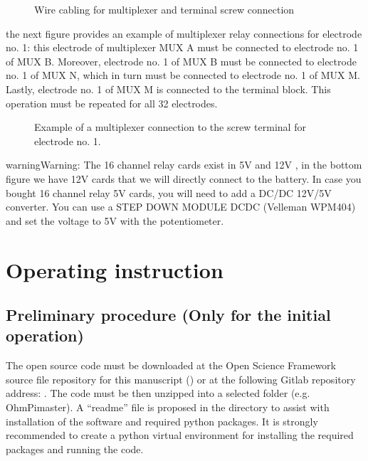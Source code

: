 \documentclass[letterpaper,10pt,english]{sphinxmanual}
\let\sphinxpxdimen\pdfpxdimen\else\newdimen\sphinxpxdimen
\begin{document}
\begin{figure}[htbp]
\centering
\capstart

\noindent\sphinxincludegraphics[width=800\sphinxpxdimen,height=300\sphinxpxdimen]{{cable}.jpg}
\caption{Wire cabling for multiplexer and terminal screw connection}\label{\detokenize{V1_02:id8}}\end{figure}

\sphinxAtStartPar
the next figure provides an example of multiplexer relay connections for electrode no. 1: this electrode of multiplexer MUX A must be connected to electrode no. 1 of MUX B. Moreover, electrode no. 1 of MUX B
must be connected to electrode no. 1 of MUX N, which in turn must be connected to electrode no. 1 of MUX M. Lastly, electrode no. 1 of MUX M is connected to the terminal block.
This operation must be repeated for all 32 electrodes.

\begin{figure}[htbp]
\centering
\capstart

\noindent\sphinxincludegraphics[width=800\sphinxpxdimen,height=800\sphinxpxdimen]{{electrode_cable}.jpg}
\caption{Example of a multiplexer connection to the screw terminal for electrode no. 1.}\label{\detokenize{V1_02:id9}}\end{figure}

\begin{sphinxadmonition}{warning}{Warning:}
\sphinxAtStartPar
The 16 channel relay cards exist in 5\sphinxhyphen{}V and 12\sphinxhyphen{}V , in the bottom figure we have 12\sphinxhyphen{}V cards that we will directly connect to the battery.
In case you bought 16 channel relay 5\sphinxhyphen{}V cards, you will need to add a DC/DC 12\sphinxhyphen{}V/5\sphinxhyphen{}V converter. You can use a STEP DOWN MODULE DC\sphinxhyphen{}DC (Velleman WPM404) and set the voltage to 5V with the potentiometer.
\end{sphinxadmonition}


\section{Operating instruction}
\label{\detokenize{V1_02:operating-instruction}}

\subsection{Preliminary procedure (Only for the initial operation)}
\label{\detokenize{V1_02:preliminary-procedure-only-for-the-initial-operation}}
\sphinxAtStartPar
The open source code must be downloaded at the Open Science Framework source file repository for this manuscript ()
or at the following Gitlab repository address: . The code must be then unzipped into a selected folder (e.g. OhmPi\sphinxhyphen{}master). A “readme” file
is proposed in the directory to assist with installation of the software and required python packages. It is strongly recommended to create a python virtual environment for installing
the required packages and running the code.
\end{document}
